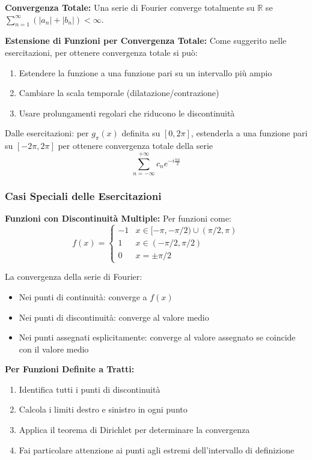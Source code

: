 \begin{info}
\textbf{Convergenza Totale:}
Una serie di Fourier converge totalmente su $\mathbb{R}$ se $\sum_{n=1}^{\infty} (|a_n| + |b_n|) < \infty$.

\textbf{Estensione di Funzioni per Convergenza Totale:}
Come suggerito nelle esercitazioni, per ottenere convergenza totale si può:
\begin{enumerate}
    \item Estendere la funzione a una funzione pari su un intervallo più ampio
    \item Cambiare la scala temporale (dilatazione/contrazione)
    \item Usare prolungamenti regolari che riducono le discontinuità
\end{enumerate}
\end{info}

\begin{esempio}
Dalle esercitazioni: per $g_\pi(x)$ definita su $[0,2\pi]$, estenderla a una funzione pari su $[-2\pi,2\pi]$ per ottenere convergenza totale della serie
\[ \sum_{n=-\infty}^{+\infty} c_n e^{-i\frac{nx}{2}} \]
\end{esempio}

\subsubsection{Casi Speciali delle Esercitazioni}

\begin{info}
\textbf{Funzioni con Discontinuità Multiple:}
Per funzioni come:
\[ f(x) = \begin{cases} -1 & x \in [-\pi,-\pi/2) \cup (\pi/2,\pi) \\ 1 & x \in (-\pi/2,\pi/2) \\ 0 & x = \pm\pi/2 \end{cases} \]

La convergenza della serie di Fourier:
\begin{itemize}
    \item Nei punti di continuità: converge a $f(x)$
    \item Nei punti di discontinuità: converge al valore medio
    \item Nei punti assegnati esplicitamente: converge al valore assegnato se coincide con il valore medio
\end{itemize}
\end{info}

\begin{strategia}
\textbf{Per Funzioni Definite a Tratti:}
\begin{enumerate}
    \item Identifica tutti i punti di discontinuità
    \item Calcola i limiti destro e sinistro in ogni punto
    \item Applica il teorema di Dirichlet per determinare la convergenza
    \item Fai particolare attenzione ai punti agli estremi dell'intervallo di definizione
\end{enumerate}
\end{strategia}


